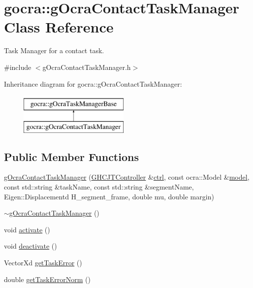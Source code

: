 \hypertarget{classgocra_1_1gOcraContactTaskManager}{}\section{gocra\+:\+:g\+Ocra\+Contact\+Task\+Manager Class Reference}
\label{classgocra_1_1gOcraContactTaskManager}


Task Manager for a contact task.  




{\ttfamily \#include $<$g\+Ocra\+Contact\+Task\+Manager.\+h$>$}

Inheritance diagram for gocra\+:\+:g\+Ocra\+Contact\+Task\+Manager\+:\begin{figure}[H]
\begin{center}
\leavevmode
\includegraphics[height=2.000000cm]{d7/d0b/classgocra_1_1gOcraContactTaskManager}
\end{center}
\end{figure}
\subsection*{Public Member Functions}
\begin{DoxyCompactItemize}
\item 
\hyperlink{classgocra_1_1gOcraContactTaskManager_aa35eda0ee0b427b7da1aca284f6da5a8}{g\+Ocra\+Contact\+Task\+Manager} (\hyperlink{classgocra_1_1GHCJTController}{G\+H\+C\+J\+T\+Controller} \&\hyperlink{classgocra_1_1gOcraTaskManagerBase_a52d76d9b54d92f3d31faeaafda99e4c7}{ctrl}, const ocra\+::\+Model \&\hyperlink{classgocra_1_1gOcraTaskManagerBase_adc439e7170f7120611fc6d009d06404e}{model}, const std\+::string \&task\+Name, const std\+::string \&segment\+Name, Eigen\+::\+Displacementd H\+\_\+segment\+\_\+frame, double mu, double margin)
\item 
\hyperlink{classgocra_1_1gOcraContactTaskManager_a196591b3cc42be1aafcaa134c9f21200}{$\sim$g\+Ocra\+Contact\+Task\+Manager} ()
\item 
void \hyperlink{classgocra_1_1gOcraContactTaskManager_a51eef1bcdf87285b5b731356c6b46727}{activate} ()
\item 
void \hyperlink{classgocra_1_1gOcraContactTaskManager_adf02de85b4a661c70cd7e2031c1b7500}{deactivate} ()
\item 
Vector\+Xd \hyperlink{classgocra_1_1gOcraContactTaskManager_a50ef70ceb95ced6818a5990fa6615d6a}{get\+Task\+Error} ()
\item 
double \hyperlink{classgocra_1_1gOcraContactTaskManager_af7865eaf5c86bca10e8911a23cceaf2a}{get\+Task\+Error\+Norm} ()
\end{DoxyCompactItemize}

